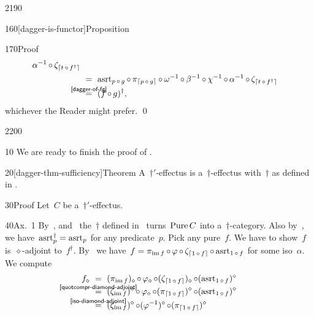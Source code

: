 \begin{parsec}{2190}
\begin{point}{160}[dagger-is-functor]{Proposition}
\begin{point}{170}{Proof}
\begin{align*}
        \alpha^{-1} \after
        \zeta_{\ceil{t \after f^\dagger}}
        \\
        & \ = \ 
    \asrt_{p \after g} \after
    \pi_{\ceil{p \after g}} \after
    \omega^{-1} \after
        \beta^{-1} \after
    \chi^{-1} \after
        \alpha^{-1} \after
        \zeta_{\ceil{t \after f^\dagger}}
        \\
        & \ \overset{\smash{\mathclap{\sref{dagger-of-fg}}}}{=} \ 
        (f \after g)^\dagger,
\end{align*}
whichever the Reader might prefer. \qed
\end{point}
\end{point}
\end{parsec}

\begin{parsec}{2200}%
\begin{point}{10}%
We are ready to finish the proof of .
\end{point}
\begin{point}{20}[dagger-thm-sufficiency]{Theorem}%
    A~$\dagger'$-effectus is a~$\dagger$-effectus
        with~$\dagger$
            as defined in .
\begin{point}{30}{Proof}%
Let~$C$ be a~$\dagger'$-effectus.
\begin{point}{40}{Ax.~1}%
By~, 
    and~
    the~$\dagger$ defined in~\sref{dagger-definition2}
    turns~$\operatorname{Pure} C$ into a~$\dagger$-category.
Also by~\sref{dagger-prime-basics},
    we have~$\mathrm{asrt}_p^\dagger = \mathrm{asrt}_p$
    for any predicate~$p$.
Pick any pure~$f$.
We have to show~$f$ is~$\diamond$-adjoint to~$f^\dagger$.
By~
    we have~$f =
    \pi_{\operatorname{im} f} \mathop{\circ} \varphi \mathop{\circ} \zeta_{\left\lceil1 \mathop{\circ} f\right\rceil}
        \mathop{\circ} \mathrm{asrt}_{1 \mathop{\circ} f}$
        for some iso~$\alpha$.
We compute
\begin{align*}
   f_\diamond 
   & \ = \ 
   (\pi_{\IM f})_\diamond \after \varphi_\diamond \after (\zeta_{\ceil{1 \after f}})_\diamond
   \after (\asrt_{1 \after f})^\diamond \\
   & \ \overset{\mathclap{\smash{\sref{quotcompr-diamond-adjoint}}}}{=} \ 
   (\zeta_{\IM f})^\diamond \after \varphi_\diamond \after (\pi_{\ceil{1 \after f}})^\diamond
   \after (\asrt_{1 \after f})^\diamond \\
   & \ \overset{\mathclap{\smash{\sref{iso-diamond-adjoint}}}}{=} \ 
   (\zeta_{\IM f})^\diamond \after (\varphi^{-1})^\diamond \after (\pi_{\ceil{1 \after f}})^\diamond

\end{align*}
\end{point}
\end{point}
\end{point}
\end{parsec}
